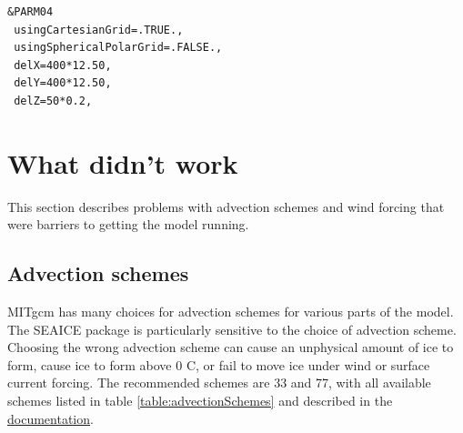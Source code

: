 \documentclass[11pt]{article}
\begin{document}
\begin{lstlisting}[caption={Sample grid namelist data}, label={listing:gridExample}]
 &PARM04
 usingCartesianGrid=.TRUE.,
 usingSphericalPolarGrid=.FALSE.,
 delX=400*12.50,
 delY=400*12.50,
 delZ=50*0.2,
\end{lstlisting}

\section{What didn't work}
This section describes problems with advection schemes and wind forcing that were barriers to getting the model running.

\subsection{Advection schemes}
MITgcm has many choices for advection schemes for various parts of the model. The SEAICE package is particularly sensitive to the choice of advection scheme. Choosing the wrong advection scheme can cause an unphysical amount of ice to form, cause ice to form above 0 C, or fail to move ice under wind or surface current forcing. The recommended schemes are 33 and 77, with all available schemes listed in table \ref{table:advectionSchemes} and described in the \href{https://mitgcm.readthedocs.io/en/latest/algorithm/algorithm.html#comparison-of-advection-schemes}{documentation}.
\end{document}
